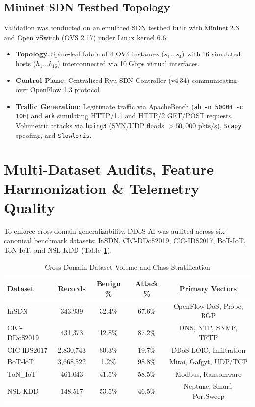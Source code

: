 \documentclass[journal]{IEEEtran}
\begin{document}
\subsection{Mininet SDN Testbed Topology}
Validation was conducted on an emulated SDN testbed built with Mininet 2.3 and Open vSwitch (OVS 2.17) under Linux kernel 6.6:
\begin{itemize}
    \item \textbf{Topology}: Spine-leaf fabric of 4 OVS instances ($s_1 \dots s_4$) with 16 simulated hosts ($h_1 \dots h_{16}$) interconnected via 10 Gbps virtual interfaces.
    \item \textbf{Control Plane}: Centralized Ryu SDN Controller (v4.34) communicating over OpenFlow 1.3 protocol.
    \item \textbf{Traffic Generation}: Legitimate traffic via ApacheBench (\texttt{ab -n 50000 -c 100}) and \texttt{wrk} simulating HTTP/1.1 and HTTP/2 GET/POST requests. Volumetric attacks via \texttt{hping3} (SYN/UDP floods $>50,000\text{ pkts/s}$), \texttt{Scapy} spoofing, and \texttt{Slowloris}.
\end{itemize}

\section{Multi-Dataset Audits, Feature Harmonization \& Telemetry Quality}
To enforce cross-domain generalizability, DDoS-AI was audited across six canonical benchmark datasets: InSDN, CIC-DDoS2019, CIC-IDS2017, BoT-IoT, ToN-IoT, and NSL-KDD (Table~\ref{tab:dataset_stratification}).

\begin{table}[h]
\centering
\caption{Cross-Domain Dataset Volume and Class Stratification}
\label{tab:dataset_stratification}
\begin{tabular}{lcccc}
\toprule
\textbf{Dataset} & \textbf{Records} & \textbf{Benign \%} & \textbf{Attack \%} & \textbf{Primary Vectors} \\
\midrule
InSDN & 343,939 & 32.4\% & 67.6\% & OpenFlow DoS, Probe, BGP \\
CIC-DDoS2019 & 431,373 & 12.8\% & 87.2\% & DNS, NTP, SNMP, TFTP \\
CIC-IDS2017 & 2,830,743 & 80.3\% & 19.7\% & DDoS LOIC, Infiltration \\
BoT-IoT & 3,668,522 & 1.2\% & 98.8\% & Mirai, Gafgyt, UDP/TCP \\
ToN\_IoT & 461,043 & 41.5\% & 58.5\% & Modbus, Ransomware \\
NSL-KDD & 148,517 & 53.5\% & 46.5\% & Neptune, Smurf, PortSweep \\
\bottomrule
\end{tabular}
\end{table}
\end{document}
